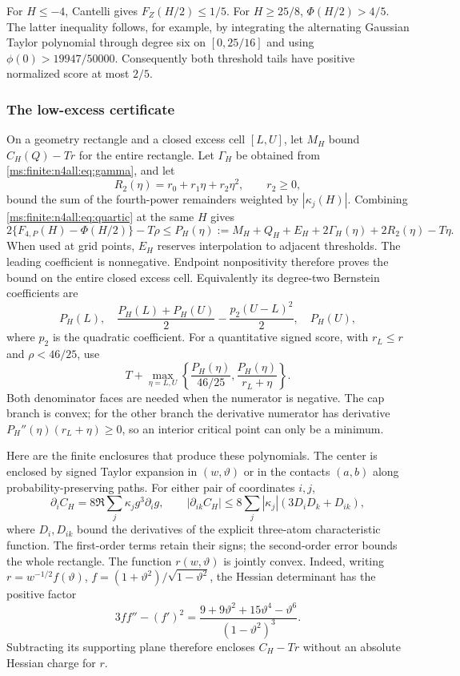 For $H\le-4$, Cantelli gives $F_Z(H/2)\le1/5$.
For $H\ge25/8$, $\Phi(H/2)>4/5$. The latter inequality follows,
for example, by integrating the alternating Gaussian Taylor
polynomial through degree six on $[0,25/16]$ and using
$\phi(0)>19947/50000$. Consequently both threshold tails have
positive normalized score at most $2/5$.

\subsubsection{The low-excess certificate}
On a geometry rectangle and a closed excess cell $[L,U]$, let
$M_H$ bound $C_H(Q)-Tr$ for the entire rectangle. Let
$\Gamma_H$ be obtained from \eqref{ms:finite:n4all:eq:gamma}, and let
\[
 R_2(\eta)=r_0+r_1\eta+r_2\eta^2,\qquad r_2\ge0,
\]
bound the sum of the fourth-power remainders weighted by
$|\kappa_j(H)|$. Combining \eqref{ms:finite:n4all:eq:quartic} at the same
$H$ gives
\begin{equation}\label{ms:finite:n4all:eq:low-polynomial}
 2\{F_{4,P}(H)-\Phi(H/2)\}-T\rho
 \le P_H(\eta):=M_H+Q_H+E_H+2\Gamma_H(\eta)+2R_2(\eta)-T\eta.
\end{equation}
When used at grid points, $E_H$ reserves interpolation to adjacent
thresholds. The leading coefficient is nonnegative. Endpoint
nonpositivity therefore proves the bound on the entire closed excess
cell. Equivalently its degree-two Bernstein coefficients are
\[
 P_H(L),\quad
 \frac{P_H(L)+P_H(U)}2-\frac{p_2(U-L)^2}{2},\quad P_H(U),
\]
where $p_2$ is the quadratic coefficient. For a quantitative signed
score, with $r_L\le r$ and $\rho<46/25$, use
\[
 T+\max_{\eta=L,U}
 \left\{\frac{P_H(\eta)}{46/25},
        \frac{P_H(\eta)}{r_L+\eta}\right\}.
\]
Both denominator faces are needed when the numerator is negative.
The cap branch is convex; for the other branch the derivative
numerator has derivative $P_H''(\eta)(r_L+\eta)\ge0$, so an
interior critical point can only be a minimum.

Here are the finite enclosures that produce these polynomials.
The center is enclosed by signed Taylor expansion in $(w,\vartheta)$
or in the contacts $(a,b)$ along probability-preserving paths.
For either pair of coordinates $i,j$,
\[
 \partial_i C_H=8\Re\sum_j\kappa_jg^3\partial_i g,\qquad
 |\partial_{ik}C_H|\le8\sum_j|\kappa_j|
       (3D_iD_k+D_{ik}),
\]
where $D_i,D_{ik}$ bound the derivatives of the explicit
three-atom characteristic function. The first-order terms retain
their signs; the second-order error bounds the whole rectangle.
The function $r(w,\vartheta)$ is jointly convex. Indeed, writing
$r=w^{-1/2}f(\vartheta)$, $f=(1+\vartheta^2)/\sqrt{1-\vartheta^2}$,
the Hessian determinant has the positive factor
\[
 3ff''-(f')^2=
 \frac{9+9\vartheta^2+15\vartheta^4-\vartheta^6}{(1-\vartheta^2)^3}.
\]
Subtracting its supporting plane therefore encloses $C_H-Tr$
without an absolute Hessian charge for $r$.

